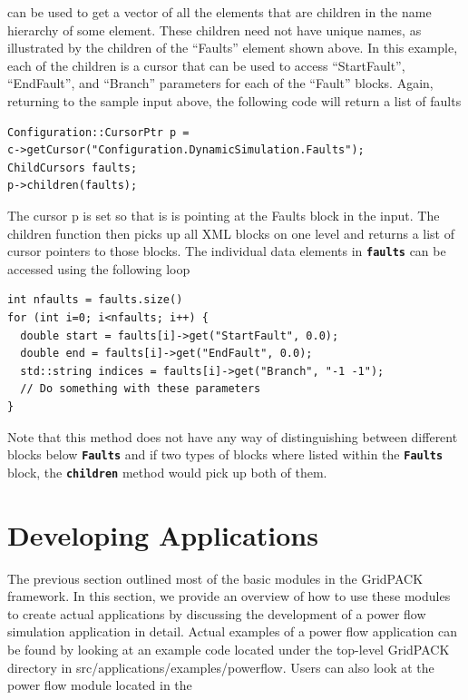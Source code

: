 \documentclass[12pt]{report} %
\begin{document}
can be used to get a vector of all the elements that are children in the name hierarchy of some element. These children need not have unique names, as illustrated by the children of the ``Faults'' element shown above. In this example, each of the children is a cursor that can be used to access ``StartFault'', ``EndFault'', and ``Branch'' parameters for each of the ``Fault'' blocks. Again, returning to the sample input above, the following code will return a list of faults

{
\color{red}
\begin{Verbatim}[fontseries=b]
Configuration::CursorPtr p = 
c->getCursor("Configuration.DynamicSimulation.Faults");
ChildCursors faults;
p->children(faults);
\end{Verbatim}
}

The cursor p is set so that is is pointing at the Faults block in the input. The children function then picks up all XML blocks on one level and returns a list of cursor pointers to those blocks. The individual data elements in \texttt{\textbf{faults}} can be accessed using the following loop

{
\color{red}
\begin{Verbatim}[fontseries=b]
int nfaults = faults.size()
for (int i=0; i<nfaults; i++) {
  double start = faults[i]->get("StartFault", 0.0);
  double end = faults[i]->get("EndFault", 0.0);
  std::string indices = faults[i]->get("Branch", "-1 -1");
  // Do something with these parameters
}
\end{Verbatim}
}

Note that this method does not have any way of distinguishing between different blocks below \texttt{\textbf{Faults}} and if two types of blocks where listed within the \texttt{\textbf{Faults}} block, the \texttt{\textbf{children}} method would pick up both of them.

\chapter{Developing Applications}

The previous section outlined most of the basic modules in the GridPACK framework. In this section, we provide an overview of how to use these modules to create actual applications by discussing the development of a power flow simulation application in detail. Actual examples of a power flow application can be found by looking at an example code located under the top-level GridPACK directory in src/applications/examples/powerflow. Users can also look at the power flow module located in the 
\end{document}
